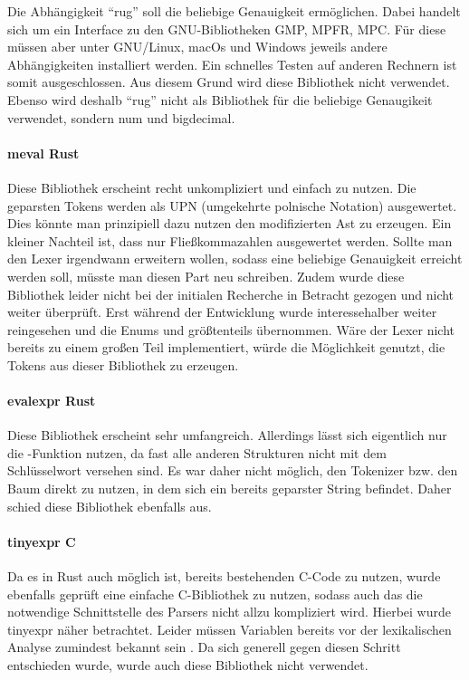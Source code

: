\documentclass[11pt,a4paper, ngerman]{article}
\begin{document}
Die Abhängigkeit ``rug'' soll die beliebige Genauigkeit ermöglichen. Dabei handelt sich um ein Interface zu den GNU-Bibliotheken GMP, MPFR, MPC. Für diese müssen aber unter GNU/Linux, macOs und Windows jeweils andere Abhängigkeiten installiert werden. Ein schnelles Testen auf anderen Rechnern ist somit ausgeschlossen. Aus diesem Grund wird diese Bibliothek nicht verwendet. Ebenso wird deshalb ``rug'' nicht als Bibliothek für die beliebige Genaugikeit verwendet, sondern num und bigdecimal.

\paragraph{meval Rust} \cite{CrateMeval} Diese Bibliothek erscheint recht unkompliziert und einfach zu nutzen. Die geparsten Tokens werden als UPN (umgekehrte polnische Notation) ausgewertet. Dies könnte man prinzipiell dazu nutzen den modifizierten Ast zu erzeugen. Ein kleiner Nachteil ist, dass nur Fließkommazahlen ausgewertet werden. Sollte man den Lexer irgendwann erweitern wollen, sodass eine beliebige Genauigkeit erreicht werden soll, müsste man diesen Part neu schreiben. Zudem wurde diese Bibliothek leider nicht bei der initialen Recherche in Betracht gezogen und nicht weiter überprüft. Erst während der Entwicklung wurde interessehalber weiter reingesehen und die Enums  und  größtenteils übernommen. Wäre der Lexer nicht bereits zu einem großen Teil implementiert, würde die Möglichkeit genutzt, die Tokens aus dieser Bibliothek zu erzeugen.

\paragraph{evalexpr Rust} \cite{CrateEvalexpr} Diese Bibliothek erscheint sehr umfangreich. Allerdings lässt sich eigentlich nur die -Funktion nutzen, da fast alle anderen Strukturen nicht mit dem Schlüsselwort  versehen sind. Es war daher nicht möglich, den Tokenizer bzw. den Baum direkt zu nutzen, in dem sich ein bereits geparster String befindet. Daher schied diese Bibliothek ebenfalls aus.

\paragraph{tinyexpr C} \cite{CTinyexpr} Da es in Rust auch möglich ist, bereits bestehenden C-Code zu nutzen, wurde ebenfalls geprüft eine einfache C-Bibliothek zu nutzen, sodass auch das die notwendige Schnittstelle des Parsers nicht allzu kompliziert wird. Hierbei wurde tinyexpr näher betrachtet. Leider müssen Variablen bereits vor der lexikalischen Analyse zumindest bekannt sein \cite{CTinyexprReadme}. Da sich generell gegen diesen Schritt entschieden wurde, wurde auch diese Bibliothek nicht verwendet.
\end{document}
